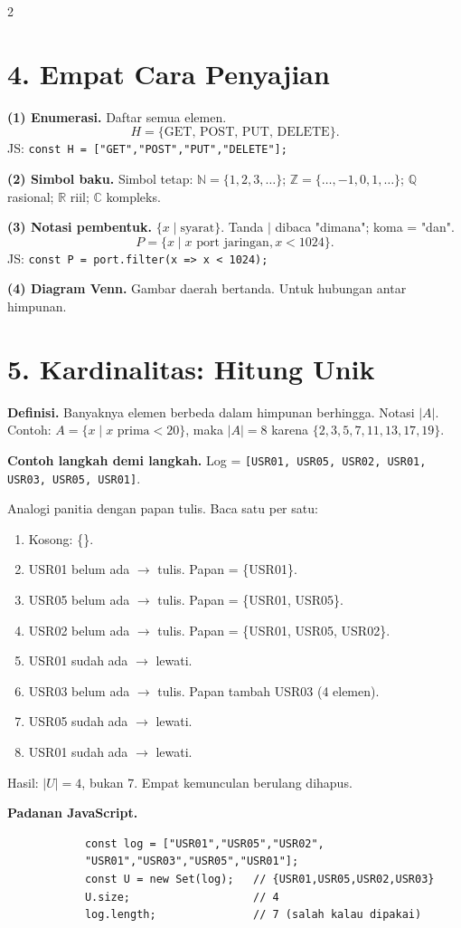 \documentclass[9pt,a4paper]{extarticle}
\newcommand{\h}[1]{\textbf{#1}}
\begin{document}
\begin{multicols*}{2}
	\section*{4. Empat Cara Penyajian}

	\h{(1) Enumerasi.} Daftar semua elemen.
	$$H=\{\text{GET, POST, PUT, DELETE}\}.$$
	JS: \texttt{const H = ["GET","POST","PUT","DELETE"];}

	\h{(2) Simbol baku.} Simbol tetap: $\mathbb{N}=\{1,2,3,\dots\}$; $\mathbb{Z}=\{\dots,-1,0,1,\dots\}$; $\mathbb{Q}$ rasional; $\mathbb{R}$ riil; $\mathbb{C}$ kompleks.

	\h{(3) Notasi pembentuk.} $\{x\mid \text{syarat}\}$. Tanda $\mid$ dibaca "dimana"; koma = "dan".
	$$P=\{x\mid x \text{ port jaringan}, x<1024\}.$$
	JS: \texttt{const P = port.filter(x => x < 1024);}

	\h{(4) Diagram Venn.} Gambar daerah bertanda. Untuk hubungan antar himpunan.

	\section*{5. Kardinalitas: Hitung Unik}

	\h{Definisi.} Banyaknya elemen berbeda dalam himpunan berhingga. Notasi $|A|$. Contoh: $A=\{x\mid x \text{ prima}<20\}$, maka $|A|=8$ karena $\{2,3,5,7,11,13,17,19\}$.

	\h{Contoh langkah demi langkah.} Log = \texttt{[USR01, USR05, USR02, USR01, USR03, USR05, USR01]}.

	Analogi panitia dengan papan tulis. Baca satu per satu:
	\begin{enumerate}
		\item Kosong: \{\}.
		\item USR01 belum ada $\to$ tulis. Papan = \{USR01\}.
		\item USR05 belum ada $\to$ tulis. Papan = \{USR01, USR05\}.
		\item USR02 belum ada $\to$ tulis. Papan = \{USR01, USR05, USR02\}.
		\item USR01 sudah ada $\to$ lewati.
		\item USR03 belum ada $\to$ tulis. Papan tambah USR03 (4 elemen).
		\item USR05 sudah ada $\to$ lewati.
		\item USR01 sudah ada $\to$ lewati.
	\end{enumerate}
	Hasil: $|U|=4$, bukan 7. Empat kemunculan berulang dihapus.

	\h{Padanan JavaScript.}
	\begin{lstlisting}
			const log = ["USR01","USR05","USR02",
			"USR01","USR03","USR05","USR01"];
			const U = new Set(log);   // {USR01,USR05,USR02,USR03}
			U.size;                   // 4
			log.length;               // 7 (salah kalau dipakai)
		\end{lstlisting}


\end{multicols*}
\end{document}

